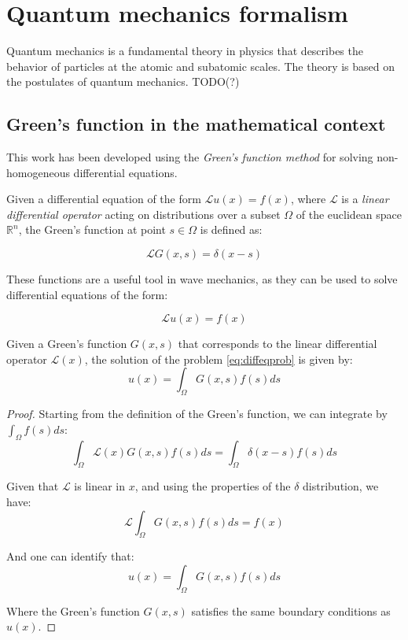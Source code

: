 \section{Quantum mechanics formalism}

Quantum mechanics is a fundamental theory in physics that describes the behavior of particles at the atomic and subatomic scales. The theory is based on the postulates of quantum mechanics. TODO(?)

\subsection{Green's function in the mathematical context}

This work has been developed using the \textit{Green's function method} for solving non-homogeneous differential equations. 

Given a differential equation of the form $\mathcal L u(x) = f(x)$, where $\mathcal L$ is a \textit{linear differential operator} acting on distributions over a subset $\Omega$ of the euclidean space $\mathbb R^n$, the Green's function at point $s\in \Omega$ is defined as:

\begin{equation}
    \mathcal L G(x,s)=\delta(x-s)
\end{equation}

These functions are a useful tool in wave mechanics, as they can be used to solve differential equations of the form:

\begin{equation}\label{eq:diffeqprob}
    \mathcal L u(x)=f(x)
\end{equation}

\begin{theorem}
    Given a Green's function $G(x,s)$ that corresponds to the linear differential operator $\mathcal{L}(x)$, the solution of the problem \ref{eq:diffeqprob} is given by:
    \begin{equation}
        u(x)=\int_\Omega G(x,s) f(s) ds
    \end{equation}
\end{theorem}

\begin{proof}
    Starting from the definition of the Green's function, we can integrate by $\int_\Omega f(s)ds$:
    \begin{equation}
        \int_\Omega \mathcal L (x) G(x,s)f(s)ds=\int_\Omega\delta (x-s)f(s)ds
    \end{equation}

    Given that $\mathcal{L}$ is linear in $x$, and using the properties of the $\delta$ distribution, we have:
    \begin{equation}
        \mathcal{L}\int_\Omega G(x,s)f(s)ds=f(x)
    \end{equation}

    And one can identify that:
    \begin{equation}
        u(x)=\int_\Omega G(x,s)f(s)ds
    \end{equation}
    
    Where the Green's function $G(x,s)$ satisfies the same boundary conditions as $u(x)$.
\end{proof}

